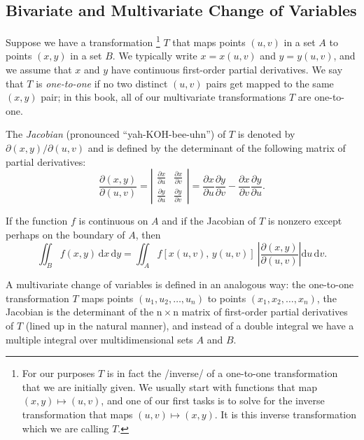 \documentclass[captions=tableheading]{scrbook}
\begin{document}
\subsection{Bivariate and Multivariate Change of Variables}
\label{sec-21-6-4}

Suppose we have a transformation
\footnote{For our purposes \(T\) is in fact the /inverse/ of a one-to-one transformation that we are initially given. We usually start with functions that map \((x,y) \longmapsto (u,v)\), and one of our first tasks is to solve for the inverse transformation that maps \((u,v)\longmapsto(x,y)\). It is this inverse transformation which we are calling \(T\).}
\(T\) that maps points \((u,v)\) in a set \(A\) to points \((x,y)\) in a set \(B\). We typically write \(x=x(u,v)\) and \(y=y(u,v)\), and we assume that \(x\) and \(y\) have continuous first-order partial derivatives. We say that \(T\) is \emph{one-to-one} if no two distinct \((u,v)\) pairs get mapped to the same \((x,y)\) pair; in this book, all of our multivariate transformations \(T\) are one-to-one.

The \emph{Jacobian} (pronounced ``yah-KOH-bee-uhn'') of \(T\) is denoted by \(\partial(x,y)/\partial(u,v)\) and is defined by the determinant of the following matrix of partial derivatives:
\begin{equation}
\frac{\partial(x,y)}{\partial(u,v)}=\left|
\begin{array}{cc}
\frac{\partial x}{\partial u} & \frac{\partial x}{\partial v}\\
\frac{\partial y}{\partial u} & \frac{\partial y}{\partial v}
\end{array}
\right|=\frac{\partial x}{\partial u}\frac{\partial y}{\partial v}-\frac{\partial x}{\partial v}\frac{\partial y}{\partial u}.
\end{equation}

If the function \(f\) is continuous on \(A\) and if the Jacobian of \(T\) is nonzero except perhaps on the boundary of \(A\), then 
\begin{equation}
\iint_{B}f(x,y)\,\mathrm{d} x\,\mathrm{d} y=\iint_{A}f\left[x(u,v),\, y(u,v)\right]\ \left|\frac{\partial(x,y)}{\partial(u,v)}\right|\mathrm{d} u\,\mathrm{d} v.
\end{equation} 

A multivariate change of variables is defined in an analogous way: the one-to-one transformation \(T\) maps points \((u_{1},u_{2},\ldots,u_{n})\) to points \((x_{1},x_{2},\ldots,x_{n})\), the Jacobian is the determinant of the \(\mathrm{n}\times\mathrm{n}\) matrix of first-order partial derivatives of \(T\) (lined up in the natural manner), and instead of a double integral we have a multiple integral over multidimensional sets \(A\) and \(B\).
\end{document}
